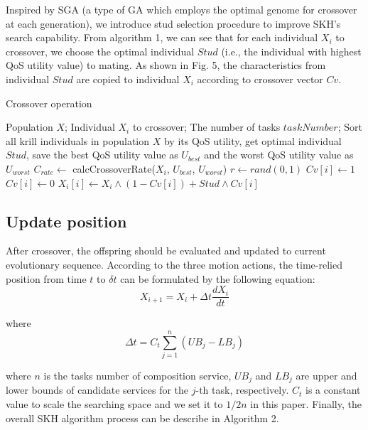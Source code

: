 \documentclass[10pt,journal,compsoc]{IEEEtran}
\begin{document}
Inspired by SGA \cite{khatib1998stud} (a type of GA which employs the optimal genome for crossover at each generation), we introduce stud selection procedure to improve SKH's search capability.
From algorithm 1, we can see that for each individual $X_i$ to crossover, we choose the optimal individual $Stud$ (i.e., the individual with highest QoS utility value) to mating. As shown in Fig. 5, the characteristics from individual $Stud$ are copied to individual $X_i$ according to crossover vector $Cv$. 

\begin{algorithm}
\caption{Crossover operation}
\label{alg1}
\begin{algorithmic}[1]

\REQUIRE Population $X$; Individual $X_i$ to crossover; The number of tasks $taskNumber$; 
\STATE Sort all krill individuals in population $X$ by its QoS utility, get optimal individual $Stud$, save the best QoS utility value as $U_{best}$ and the worst QoS utility value as $U_{worst}$
\STATE $C_{rate} \leftarrow$ calcCrossoverRate($X_i$, $U_{best}$, $U_{worst}$)
\STATE $r \leftarrow rand(0,1)$
\STATE $Cv[i] \leftarrow 1$
\ELSE
\STATE $Cv[i] \leftarrow 0$
\ENDIF
\ENDFOR
{}
\STATE $X_i[i] \leftarrow X_i \wedge  (1-Cv[i]) + Stud \wedge Cv[i]$ 
\ENDFOR
\end{algorithmic}
\end{algorithm}

\subsection{Update position}
After crossover, the offspring should be evaluated and updated to current evolutionary sequence.
According to the three motion actions, the time-relied position from time $t$ to $\delta t$ can be formulated by the following equation:
\begin{equation}
X_{i+1} = X_i + \Delta t \frac{dX_i}{dt}
\end{equation}

where
\begin{equation}
\Delta t = C_t\sum_{j=1}^{n}(UB_j - LB_j)
\end{equation}

where $n$ is the tasks number of composition service, $UB_j$ and $LB_j$ are upper and lower bounds of candidate services for the $j$-th task, respectively. $C_t$ is a constant value to scale the searching space and we set it to $1/2n$ in this paper. Finally, the overall SKH algorithm process can be describe in Algorithm 2.
\end{document}
